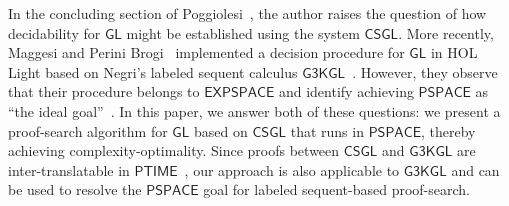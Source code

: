 \documentclass[copyright,creativecommons]{eptcs}
\newcommand{\treegl}{\mathsf{CSGL}}
\newcommand{\logicgl}{\mathsf{GL}}
\newcommand{\pspace}{\mathsf{PSPACE}}
\newcommand{\ptime}{\mathsf{PTIME}}
\newcommand{\expspace}{\mathsf{EXPSPACE}}
\begin{document}
In the concluding section of Poggiolesi~\cite{Pog09b}, the author raises the question of how decidability for $\logicgl$ might be established using the system $\treegl$. More recently, Maggesi and Perini Brogi~\cite{MagPer23} implemented a decision procedure for $\logicgl$ in HOL Light based on Negri's labeled sequent calculus $\mathsf{G3KGL}$~\cite{Neg14}. However, they observe that their procedure belongs to $\expspace$ and identify achieving $\pspace$ as ``the ideal goal''~\cite[Section~7]{MagPer23}. In this paper, we answer both of these questions: we present a proof-search algorithm for $\logicgl$ based on $\treegl$ that runs in $\pspace$, thereby achieving complexity-optimality. Since proofs between $\treegl$ and $\mathsf{G3KGL}$ are inter-translatable in $\ptime$~\cite{GorRam12,LyoOst24}, our approach is also applicable to $\mathsf{G3KGL}$ and can be used to resolve the $\pspace$ goal for labeled sequent-based proof-search.
\end{document}
